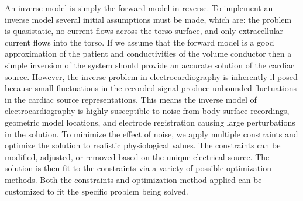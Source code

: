 An inverse model is simply the forward model in reverse. To implement an inverse model several initial
assumptions must be made, which are: the problem is quasistatic, no current
flows across the torso surface, and only extracellular current flows into
the torso. If we assume that
the forward model is a good approximation of the patient and conductivities
of the volume conductor then a simple inversion of the system should
provide an accurate solution of the cardiac source. However, the inverse
problem in electrocardiography is inherently il-posed because small
fluctuations in the recorded signal produce unbounded fluctuations in the
cardiac source representations. This means the inverse model of
electrocardiography is highly susceptible to noise from body surface
recordings, geometric model locations, and electrode registration causing
large perturbations in the solution. To minimize the effect of noise, we
apply multiple constraints and optimize the solution to realistic
physiological values. The constraints can be modified, adjusted, or
removed based on the unique electrical source. The solution is then fit to
the constraints via a variety of possible optimization methods. Both the
constraints and optimization method applied can be customized to fit the
specific problem being solved.

